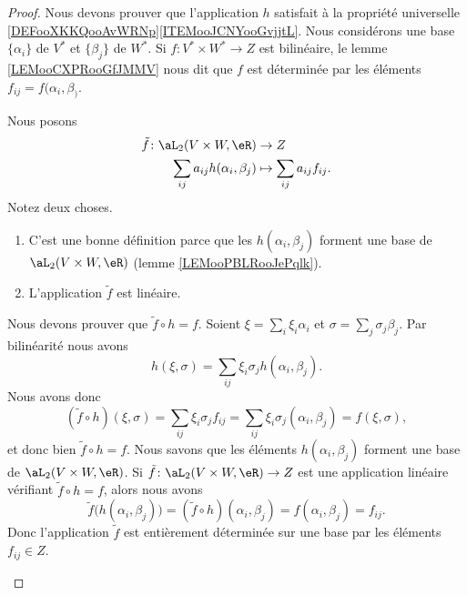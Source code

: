 \begin{proof}
	Nous devons prouver que l'application \( h\) satisfait à la propriété universelle \ref{DEFooXKKQooAvWRNp}\ref{ITEMooJCNYooGvjjtL}. Nous considérons une base \( \{ \alpha_i \}\) de \( V^*\) et \( \{ \beta_j \}\) de \( W^*\). Si \(f \colon V^*\times W^*\to Z  \) est bilinéaire, le lemme \ref{LEMooCXPRooGfJMMV} nous dit que \( f\) est déterminée par les éléments \(f_{ij}= f(\alpha_i,\beta_)\).

	\begin{subproof}
		\spitem[Existence]
		Nous posons
		\begin{equation}
			\begin{aligned}
				\tilde f\colon \aL_2(V\times W,\eR) & \to Z                          \\
				\sum_{ij}a_{ij}h(\alpha_i,\beta_j)  & \mapsto \sum_{ij}a_{ij}f_{ij}.
			\end{aligned}
		\end{equation}
		Notez deux choses.
		\begin{enumerate}
			\item
			      C'est une bonne définition parce que les \( h(\alpha_i,\beta_j)\) forment une base de \( \aL_2(V\times W,\eR)\) (lemme \ref{LEMooPBLRooJePqlk}).
			\item
			      L'application \( \tilde  f\) est linéaire.
		\end{enumerate}

		Nous devons prouver que \( \tilde f\circ h=f\). Soient \( \xi=\sum_i\xi_i\alpha_i\) et \( \sigma=\sum_j\sigma_j\beta_j\). Par bilinéarité nous avons
		\begin{equation}
			h(\xi,\sigma)=\sum_{ij}\xi_i\sigma_jh(\alpha_i,\beta_j).
		\end{equation}
		Nous avons donc
		\begin{equation}
			(\tilde f\circ h)(\xi,\sigma)=\sum_{ij}\xi_i\sigma_jf_{ij}=\sum_{ij}\xi_i\sigma_j(\alpha_i,\beta_j)=f(\xi,\sigma),
		\end{equation}
		et donc bien \( \tilde f\circ h=f\).
		\spitem[Unicité]
		Nous savons que les éléments \( h(\alpha_i,\beta_j)\) forment une base de \( \aL_2(V\times W,\eR)\). Si \(\tilde f \colon \aL_2(V\times W,\eR)\to Z  \) est une application linéaire vérifiant \( \tilde f\circ h=f\), alors nous avons
		\begin{equation}
			\tilde f\big( h(\alpha_i,\beta_j) \big)=(\tilde f\circ h)(\alpha_i,\beta_j)=f(\alpha_i,\beta_j)=f_{ij}.
		\end{equation}
		Donc l'application \( \tilde f \) est entièrement déterminée sur une base par les éléments \( f_{ij}\in Z\).
	\end{subproof}
\end{proof}

